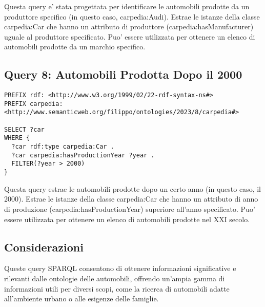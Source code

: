 Questa query e' stata progettata per identificare le automobili prodotte da un produttore specifico
(in questo caso, carpedia:Audi). Estrae le istanze della classe carpedia:Car che hanno un attributo di produttore
(carpedia:hasManufacturer) uguale al produttore specificato. Puo' essere utilizzata per ottenere un elenco
di automobili prodotte da un marchio specifico.

\subsection{Query 8: Automobili Prodotta Dopo il 2000}

\begin{verbatim}
PREFIX rdf: <http://www.w3.org/1999/02/22-rdf-syntax-ns#>
PREFIX carpedia: <http://www.semanticweb.org/filippo/ontologies/2023/8/carpedia#>

SELECT ?car
WHERE {
  ?car rdf:type carpedia:Car .
  ?car carpedia:hasProductionYear ?year .
  FILTER(?year > 2000)
}
\end{verbatim}


Questa query estrae le automobili prodotte dopo un certo anno (in questo caso, il 2000).
Estrae le istanze della classe carpedia:Car che hanno un attributo di anno di produzione (carpedia:hasProductionYear)
superiore all'anno specificato.
Puo' essere utilizzata per ottenere un elenco di automobili prodotte nel XXI secolo.


\subsection{Considerazioni}
Queste query SPARQL consentono di ottenere informazioni significative e rilevanti dalle ontologie delle automobili,
offrendo un'ampia gamma di informazioni utili per diversi scopi, come la ricerca di automobili adatte all'ambiente
urbano o alle esigenze delle famiglie.
